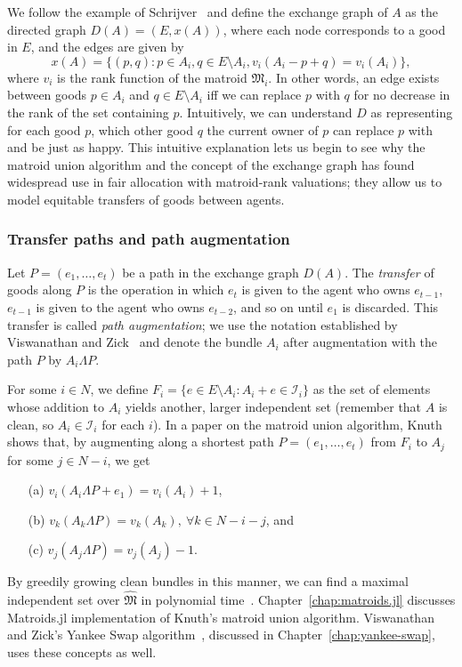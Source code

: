We follow the example of Schrijver~\cite{schrijver-2003} and define the exchange graph of $A$ as the directed graph $D(A)=(E, x(A))$, where each node corresponds to a good in $E$, and the edges are given by
$$x(A) = \{ (p,q) : p \in A_i, q \in E\setminus A_i, v_i(A_i - p + q) = v_i(A_i) \},$$
where $v_i$ is the rank function of the matroid $\mathfrak{M}_i$. In other words, an edge exists between goods $p\in A_i$ and $q\in E\setminus A_i$ iff we can replace $p$ with $q$ for no decrease in the rank of the set containing $p$. Intuitively, we can understand $D$ as representing for each good $p$, which other good $q$ the current owner of $p$ can replace $p$ with and be just as happy. This intuitive explanation lets us begin to see why the matroid union algorithm and the concept of the exchange graph has found widespread use in fair allocation with matroid-rank valuations; they allow us to model equitable transfers of goods between agents.

\subsubsection*{Transfer paths and path augmentation}
Let $P = (e_1, \dots, e_t)$ be a path in the exchange graph $D(A)$. The \textit{transfer} of goods along $P$ is the operation in which $e_t$ is given to the agent who owns $e_{t-1}$, $e_{t-1}$ is given to the agent who owns $e_{t-2}$, and so on until $e_1$ is discarded. This transfer is called \textit{path augmentation}; we use the notation established by Viswanathan and Zick~\cite{viswanathan2023yankee} and denote the bundle $A_i$ after augmentation with the path $P$ by $A_i \Lambda P$. 

For some $i\in N$, we define $F_i = \{ e\in E\setminus A_i : A_i + e \in \mathcal{I}_i \}$ as the set of elements whose addition to $A_i$ yields another, larger independent set (remember that $A$ is clean, so $A_i\in\mathcal{I}_i$ for each $i$). In a paper on the matroid union algorithm, Knuth~\cite{knuth1973matroidpartitioning} shows that, by augmenting along a shortest path $P = (e_1,\dots,e_t)$ from $F_i$ to $A_j$ for some $j \in N - i$, we get
\begin{enumerate}
  \item[(a)] $v_i(A_i\Lambda P + e_1) = v_i(A_i) + 1$,
  \item[(b)] $v_k(A_k\Lambda P) = v_k(A_k),\ \forall k\in N - i - j$, and
  \item[(c)] $v_j(A_j\Lambda P) = v_j(A_j) - 1$.
\end{enumerate}
By greedily growing clean bundles in this manner, we can find a maximal independent set over $\widehat{\mathfrak{M}}$ in polynomial time~\cite{schrijver-2003}. Chapter~\ref{chap:matroids.jl} discusses Matroids.jl implementation of Knuth's matroid union algorithm. Viswanathan and Zick's Yankee Swap algorithm~\cite{viswanathan2023yankee}, discussed in Chapter~\ref{chap:yankee-swap}, uses these concepts as well.

